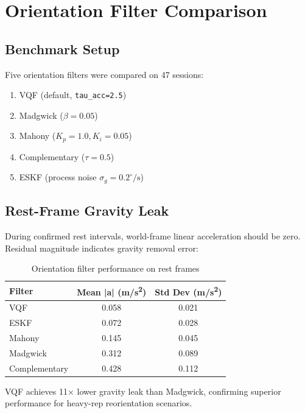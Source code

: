 \section{Orientation Filter Comparison}

\subsection{Benchmark Setup}

Five orientation filters were compared on 47 sessions:
\begin{enumerate}
    \item VQF (default, \texttt{tau\_acc=2.5})
    \item Madgwick ($\beta=0.05$)
    \item Mahony ($K_p=1.0, K_i=0.05$)
    \item Complementary ($\tau=0.5$)
    \item ESKF (process noise $\sigma_g=0.2^\circ/\text{s}$)
\end{enumerate}

\subsection{Rest-Frame Gravity Leak}

During confirmed rest intervals, world-frame linear acceleration should be zero. Residual magnitude indicates gravity removal error:

\begin{table}[h]
    \centering
    \caption{Orientation filter performance on rest frames}
    \label{tab:filter_comparison}
    \begin{tabular}{lcc}
        \toprule
        \textbf{Filter} & \textbf{Mean |a| (m/s\textsuperscript{2})} & \textbf{Std Dev (m/s\textsuperscript{2})} \\
        \midrule
        VQF & 0.058 & 0.021 \\
        ESKF & 0.072 & 0.028 \\
        Mahony & 0.145 & 0.045 \\
        Madgwick & 0.312 & 0.089 \\
        Complementary & 0.428 & 0.112 \\
        \bottomrule
    \end{tabular}
\end{table}

VQF achieves 11$\times$ lower gravity leak than Madgwick, confirming superior performance for heavy-rep reorientation scenarios.

